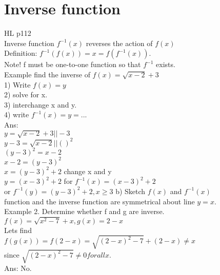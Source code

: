 \documentclass{article}
\begin{document}
  \section{Inverse function}
  HL p112\\
  Inverse function $f^{-1}(x)$ reverses the action of $f(x)$\\
  Definition: $f^{-1}(f(x))=x=f(f^{-1}(x))$.\\ 
  Note! f must be one-to-one function so that $f^{-1}$ exists.\\
  Example find the inverse of $f(x)=\sqrt{x-2}+3$\\
  1) Write $f(x)=y$\\
  2) solve for x.\\
  3) interchange x and y.\\
  4) write $f^{-1}(x)=y=...$\\
  Ans: \\
  $y=\sqrt{x-2}+3 ||-3$\\
  $y-3=\sqrt{x-2} || ()^2$\\
  $(y-3)^2=x-2$\\
  $x-2=(y-3)^2$\\
  $x=(y-3)^2+2$ change x and y\\
  $y=(x-3)^2+2$ for $f^{-1}(x)=(x-3)^2+2$\\
  or $f^{-1}(y)=(y-3)^2+2, x\geq3$
  b) Sketch $f(x)$ and $f^{-1}(x)$\\
  function and the inverse function are symmetrical about line $y=x$.\\
  Example 2. Determine whether f and g are inverse. $f(x)=\sqrt{x^2-7}+x, g(x)=2-x$\\
  Lets find\\
  $f(g(x))=f(2-x)=\sqrt{(2-x)^2-7}+(2-x)\neq x$\\
  since $\sqrt{(2-x)^2-7}\neq0 for all x.$\\
  Ans: No.\\
  
\end{document}
